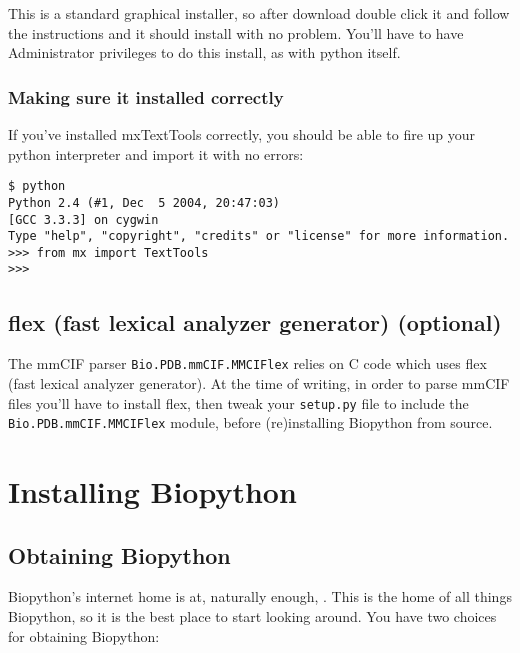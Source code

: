 \documentclass{article}
\begin{document}
This is a standard graphical installer, so after download double click
it and follow the instructions and it should install with no problem.
You'll have to have Administrator privileges to do this install, as with
python itself.

\subsubsection{Making sure it installed correctly}

If you've installed mxTextTools correctly, you should be able to fire up
your python interpreter and import it with no errors:

\begin{verbatim}
$ python
Python 2.4 (#1, Dec  5 2004, 20:47:03)
[GCC 3.3.3] on cygwin
Type "help", "copyright", "credits" or "license" for more information.
>>> from mx import TextTools
>>>
\end{verbatim}

\subsection{flex (fast lexical analyzer generator) (optional)}

The mmCIF parser \verb|Bio.PDB.mmCIF.MMCIFlex| relies on C code which
uses flex (fast lexical analyzer generator).  At the time of writing,
in order to parse mmCIF files you'll have to install flex, then tweak
your \verb|setup.py| file to include the \verb|Bio.PDB.mmCIF.MMCIFlex|
module, before (re)installing Biopython from source.

\section{Installing Biopython}

\subsection{Obtaining Biopython}
Biopython's internet home is at, naturally enough,  
. This is the home of all things 
Biopython, so it is the best place to start looking around. 
You have two choices for obtaining Biopython:
\end{document}
